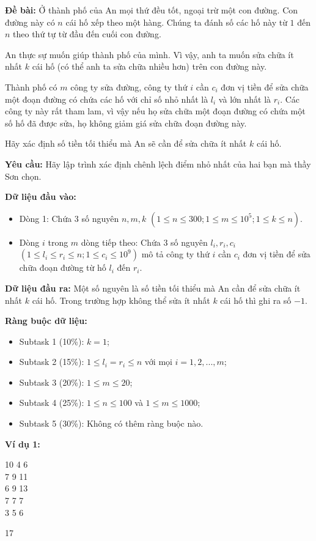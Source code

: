 \documentclass[12pt]{scrartcl}  %
\begin{document}
\textbf{Đề bài:}
Ở thành phố của An mọi thứ đều tốt, ngoại trừ một con đường. Con đường này có $n$ cái hố xếp theo một hàng. Chúng ta đánh số các hố này từ $1$ đến $n$ theo thứ tự từ đầu đến cuối con đường.

An thực sự muốn giúp thành phố của mình. Vì vậy, anh ta muốn sửa chữa ít nhất $k$ cái hố (có thể anh ta sửa chữa nhiều hơn) trên con đường này.

Thành phố có $m$ công ty sửa đường, công ty thứ $i$ cần $c_i$ đơn vị tiền để sửa chữa một đoạn đường có chứa các hố với chỉ số nhỏ nhất là $l_i$ và lớn nhất là $r_i$. Các công ty này rất tham lam, vì vậy nếu họ sửa chữa một đoạn đường có chứa một số hố đã được sửa, họ không giảm giá sửa chữa đoạn đường này.

Hãy xác định số tiền tối thiểu mà An sẽ cần để sửa chữa ít nhất $k$ cái hố.

\textbf{Yêu cầu:}
Hãy lập trình xác định chênh lệch điểm nhỏ nhất của hai bạn mà thầy Sơn chọn.

\textbf{Dữ liệu đầu vào:}
\begin{itemize}
    \item Dòng 1: Chứa $3$ số nguyên $n, m, k$ $(1 \leq n \leq 300; 1 \leq m \leq 10^5; 1 \leq k \leq n)$.
    \item Dòng $i$ trong $m$ dòng tiếp theo: Chứa $3$ số nguyên $l_i, r_i, c_i$ $(1 \leq l_i \leq r_i \leq n; 1 \leq c_i \leq 10^9)$ mô tả công ty thứ $i$ cần $c_i$ đơn vị tiền để sửa chữa đoạn đường từ hố $l_i$ đến $r_i$.
\end{itemize}

\textbf{Dữ liệu đầu ra:}
Một số nguyên là số tiền tối thiểu mà An cần để sửa chữa ít nhất $k$ cái hố. Trong trường hợp không thể sửa ít nhất $k$ cái hố thì ghi ra số $-1$.

\textbf{Ràng buộc dữ liệu:}
\begin{itemize}
    \item Subtask 1 (10\%): $k = 1$;
    \item Subtask 2 (15\%): $1 \leq l_i = r_i \leq n$ với mọi $i = 1, 2, ..., m$;
    \item Subtask 3 (20\%): $1 \leq m \leq 20$;
    \item Subtask 4 (25\%): $1 \leq n \leq 100$ và $1 \leq m \leq 1000$;
    \item Subtask 5 (30\%): Không có thêm ràng buộc nào.
\end{itemize}

\textbf{Ví dụ 1:}
\begin{tcolorbox}[colback=gray!5!white, colframe=blue!50!black, title=Input]
10 4 6\\
7 9 11\\
6 9 13\\
7 7 7\\
3 5 6
\end{tcolorbox}
\begin{tcolorbox}[colback=gray!5!white, colframe=green!50!black, title=Output]
17
\end{tcolorbox}
\end{document}
